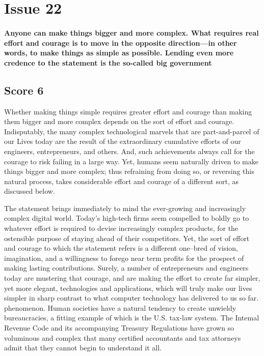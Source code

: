 \section{Issue 22}
\paragraph{
Anyone can make things bigger and more complex.
What requires real effort and courage is to move in the opposite direction---in other words, to make things as simple as possible.
Lending even more credence to the statement is the so-called big government
}
\subsection{Score 6}


Whether making things simple requires greater effort and courage than making them bigger and more complex depends on the sort of effort and courage.
Indisputably, the many complex technological marvels that are part-and-parcel of our Lives today are the result of the extraordinary cumulative efforts of our engineers, entrepreneurs, and others.
And, such achievements always call for the courage to risk failing in a large way.
Yet, humans seem naturally driven to make things bigger and more complex; thus refraining from doing so, or reversing this natural process, takes considerable effort and courage of a different sort, as discussed below.


The statement brings immediately to mind the ever-growing and increasingly complex digital world.
Today's high-tech firms seem compelled to boldly go to whatever effort is required to devise increasingly complex products, for the ostensible purpose of staying ahead of their competitors.
Yet, the sort of effort and courage to which the statement refers is a different one--bred of vision, imagination, and a willingness to forego near term profits for the prospect of making lasting contributions.
Surely, a number of entrepreneurs and engineers today are mustering that courage, and are making the effort to create far simpler, yet more elegant, technologies and applications, which will truly make our lives simpler in sharp contrast to what computer technology has delivered to us so far.
phenomenon.
Human societies have a natural tendency to create unwieldy bureaucracies, a fitting example of which is the U.S.
tax-law system.
The Intemal Revenue Code and its accompanying Treasury Regulations have grown so voluminous and complex that many certified accountants and tax attorneys admit that they cannot begin to understand it all.


